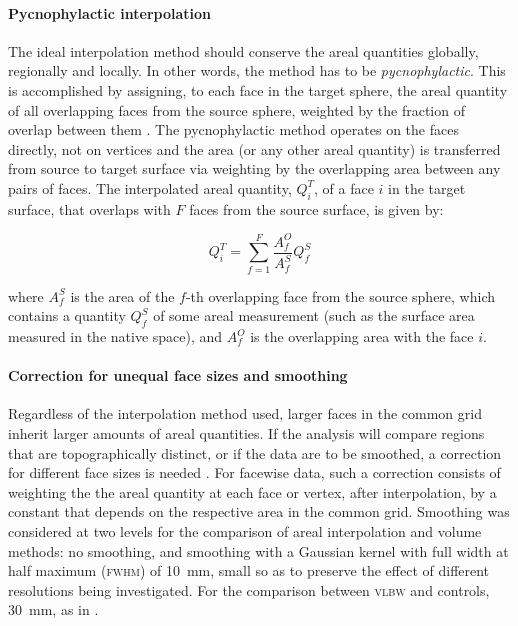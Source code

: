 \paragraph{Pycnophylactic interpolation}

The ideal interpolation method should conserve the areal quantities globally, regionally and locally. In other words, the method has to be \emph{pycnophylactic}. This is accomplished by assigning, to each face in the target sphere, the areal quantity of all overlapping faces from the source sphere, weighted by the fraction of overlap between them \citep{Markoff1973, Winkler2012}. The pycnophylactic method operates on the faces directly, not on vertices and the area (or any other areal quantity) is transferred from source to target surface via weighting by the overlapping area between any pairs of faces. The interpolated areal quantity, $Q^{T}_{i}$, of a face $i$ in the target surface, that overlaps with $F$ faces from the source surface, is given by:

$$
Q^{T}_{i} = \sum_{f=1}^{F} \frac{A^{O}_{f}}{A^{S}_{f}} Q^{S}_{f}
$$

\noindent
where $A^{S}_{f}$ is the area of the $f$-th overlapping face from the source sphere, which contains a quantity $Q^{S}_{f}$ of some areal measurement (such as the surface area measured in the native space), and $A^{O}_{f}$ is the overlapping area with the face $i$.

\paragraph{Correction for unequal face sizes and smoothing}

Regardless of the interpolation method used, larger faces in the common grid inherit larger amounts of areal quantities. If the analysis will compare regions that are topographically distinct, or if the data are to be smoothed, a correction for different face sizes is needed \citep{Winkler2012}. For facewise data, such a correction consists of weighting the the areal quantity at each face or vertex, after interpolation, by a constant that depends on the respective area in the common grid. Smoothing was considered at two levels for the comparison of areal interpolation and volume methods: no smoothing, and smoothing with a Gaussian kernel with full width at half maximum (\textsc{fwhm}) of 10~mm, small so as to preserve the effect of different resolutions being investigated. For the comparison between \textsc{vlbw} and controls, 30~mm, as in \citet{Skranes2013}.

